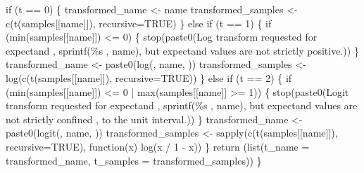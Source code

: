 \documentclass[
  letterpaper,
  DIV=11,
  numbers=noendperiod]{scrartcl}
\newenvironment{Shaded}{\begin{snugshade}}{\end{snugshade}}
\newcommand{\BuiltInTok}[1]{\textcolor[rgb]{0.00,0.23,0.31}{#1}}
\newcommand{\ControlFlowTok}[1]{\textcolor[rgb]{0.00,0.23,0.31}{#1}}
\newcommand{\DecValTok}[1]{\textcolor[rgb]{0.68,0.00,0.00}{#1}}
\newcommand{\NormalTok}[1]{\textcolor[rgb]{0.00,0.23,0.31}{#1}}
\newcommand{\OperatorTok}[1]{\textcolor[rgb]{0.37,0.37,0.37}{#1}}
\newcommand{\SpecialCharTok}[1]{\textcolor[rgb]{0.37,0.37,0.37}{#1}}
\newcommand{\StringTok}[1]{\textcolor[rgb]{0.13,0.47,0.30}{#1}}
\begin{document}
\begin{Shaded}
\begin{Highlighting}[]
  \ControlFlowTok{if}\NormalTok{ (t }\OperatorTok{==} \DecValTok{0}\NormalTok{) \{}
\NormalTok{    transformed\_name }\OperatorTok{\textless{}{-}}\NormalTok{ name}
\NormalTok{    transformed\_samples }\OperatorTok{\textless{}{-}}\NormalTok{ c(t(samples[[name]]), recursive}\OperatorTok{=}\NormalTok{TRUE)}
\NormalTok{  \} }\ControlFlowTok{else} \ControlFlowTok{if}\NormalTok{ (t }\OperatorTok{==} \DecValTok{1}\NormalTok{) \{}
    \ControlFlowTok{if}\NormalTok{ (}\BuiltInTok{min}\NormalTok{(samples[[name]]) }\OperatorTok{\textless{}=} \DecValTok{0}\NormalTok{) \{}
\NormalTok{      stop(paste0(}\StringTok{\textquotesingle{}Log transform requested for expectand \textquotesingle{}}\NormalTok{,}
\NormalTok{                  sprintf(}\StringTok{\textquotesingle{}}\SpecialCharTok{\%s}\StringTok{ \textquotesingle{}}\NormalTok{, name),}
                  \StringTok{\textquotesingle{}but expectand values are not strictly positive.\textquotesingle{}}\NormalTok{))}
\NormalTok{    \}}
\NormalTok{    transformed\_name }\OperatorTok{\textless{}{-}}\NormalTok{ paste0(}\StringTok{\textquotesingle{}log(\textquotesingle{}}\NormalTok{, name, }\StringTok{\textquotesingle{})\textquotesingle{}}\NormalTok{)}
\NormalTok{    transformed\_samples }\OperatorTok{\textless{}{-}}\NormalTok{ log(c(t(samples[[name]]), recursive}\OperatorTok{=}\NormalTok{TRUE))}
\NormalTok{  \} }\ControlFlowTok{else} \ControlFlowTok{if}\NormalTok{ (t }\OperatorTok{==} \DecValTok{2}\NormalTok{) \{}
    \ControlFlowTok{if}\NormalTok{ (}\BuiltInTok{min}\NormalTok{(samples[[name]]) }\OperatorTok{\textless{}=} \DecValTok{0} \OperatorTok{|} \BuiltInTok{max}\NormalTok{(samples[[name]] }\OperatorTok{\textgreater{}=} \DecValTok{1}\NormalTok{)) \{}
\NormalTok{      stop(paste0(}\StringTok{\textquotesingle{}Logit transform requested for expectand \textquotesingle{}}\NormalTok{,}
\NormalTok{                  sprintf(}\StringTok{\textquotesingle{}}\SpecialCharTok{\%s}\StringTok{ \textquotesingle{}}\NormalTok{ , name),}
                  \StringTok{\textquotesingle{}but expectand values are not strictly confined \textquotesingle{}}\NormalTok{,}
                  \StringTok{\textquotesingle{}to the unit interval.\textquotesingle{}}\NormalTok{))}
\NormalTok{    \}}
\NormalTok{    transformed\_name }\OperatorTok{\textless{}{-}}\NormalTok{ paste0(}\StringTok{\textquotesingle{}logit(\textquotesingle{}}\NormalTok{, name, }\StringTok{\textquotesingle{})\textquotesingle{}}\NormalTok{)}
\NormalTok{    transformed\_samples }\OperatorTok{\textless{}{-}}\NormalTok{ sapply(c(t(samples[[name]]), recursive}\OperatorTok{=}\NormalTok{TRUE), }
\NormalTok{                                  function(x) log(x }\OperatorTok{/} \DecValTok{1} \OperatorTok{{-}}\NormalTok{ x))}
\NormalTok{  \}}
  \ControlFlowTok{return}\NormalTok{ (}\BuiltInTok{list}\NormalTok{(}\StringTok{\textquotesingle{}t\_name\textquotesingle{}} \OperatorTok{=}\NormalTok{ transformed\_name, }
               \StringTok{\textquotesingle{}t\_samples\textquotesingle{}} \OperatorTok{=}\NormalTok{ transformed\_samples))}
\NormalTok{\}}
\end{Highlighting}
\end{Shaded}
\end{document}
